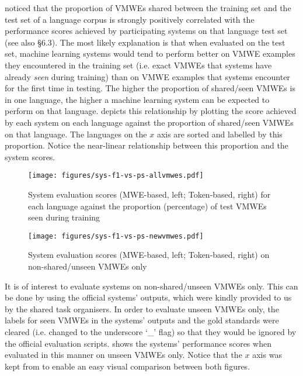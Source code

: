 \documentclass[output=paper
,modfonts
,nonflat,draftmode]{langsci/langscibook}
\begin{document}
\citet{maldonado2017} noticed that the proportion of VMWEs shared between the training set and the test set of a language corpus is strongly positively correlated with the performance scores achieved by participating systems on that language test set (see also  §6.3). The most likely explanation is that when evaluated on the test set, machine learning systems would tend to perform better on VMWE examples they encountered in the training set (i.e. exact VMWEs that systems have already \emph{seen} during training) than on VMWE examples that systems encounter for the first time in testing. The higher the proportion of shared/seen VMWEs is in one language, the higher a machine learning system can be expected to perform on that language.  depicts this relationship by plotting the score achieved by each system on each language against the proportion of shared/seen VMWEs on that language. The languages on the $x$ axis are sorted and labelled by this proportion. Notice the near-linear relationship between this proportion and the system scores.

\begin{figure}
\texttt{[image: figures/sys-f1-vs-ps-allvmwes.pdf]}
\caption{\label{fig:f1-vs-ps-all}System evaluation scores (MWE-based, left; Token-based, right) for each language against the proportion (percentage) of test VMWEs seen during training}
\end{figure}

\begin{figure}
\texttt{[image: figures/sys-f1-vs-ps-newvmwes.pdf]}
\caption{\label{fig:f1-vs-ps-new}System evaluation scores (MWE-based, left; Token-based, right) on non-shared/unseen VMWEs only}
\end{figure}

It is of interest to evaluate systems on non-shared/unseen VMWEs only. This can be done by using the official systems' outputs, which were kindly provided to us by the shared task organisers. In order to evaluate unseen VMWEs only, the labels for seen VMWEs in the systems' outputs and the gold standards were cleared (i.e. changed to the underscore `\_' flag) so that they would be ignored by the official evaluation scripts.  shows the systems' performance scores when evaluated in this manner on unseen VMWEs only. Notice that the $x$ axis was kept from  to enable an easy visual comparison between both figures.
\end{document}
